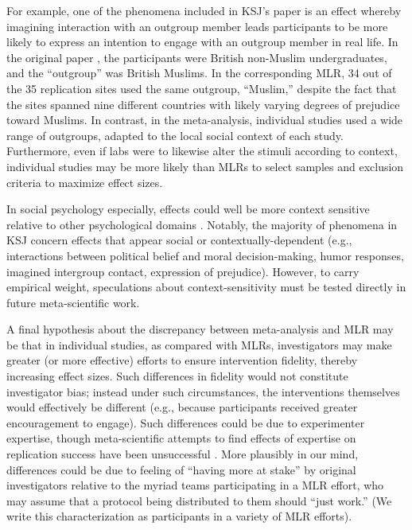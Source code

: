 \documentclass[man,floatsintext]{apa7}
\begin{document}
For example, one of the phenomena included in KSJ’s paper is an effect whereby imagining interaction with an outgroup member leads participants to be more likely to express an intention to engage with an outgroup member in real life. In the original paper \parencite{husnu2010elaboration}, the participants were British non-Muslim undergraduates, and the “outgroup” was British Muslims. In the corresponding MLR, 34 out of the 35 replication sites used the same outgroup, “Muslim,” despite the fact that the sites spanned nine different countries with likely varying degrees of prejudice toward Muslims. In contrast, in the meta-analysis, individual studies used a wide range of outgroups, adapted to the local social context of each study. Furthermore, even if labs were to likewise alter the stimuli according to context, individual studies may be more likely than MLRs to select samples and exclusion criteria to maximize effect sizes.

In social psychology especially, effects could well be more context sensitive relative to other psychological domains \parencite{van2016contextual,inbar2016association}. Notably, the majority of phenomena in KSJ concern effects that appear social or contextually-dependent (e.g., interactions between political belief and moral decision-making, humor responses, imagined intergroup contact, expression of prejudice). However, to carry empirical weight, speculations about context-sensitivity must be tested directly in future meta-scientific work. 

A final hypothesis about the discrepancy between meta-analysis and MLR may be that in individual studies, as compared with MLRs, investigators may make greater (or more effective) efforts to ensure intervention fidelity, thereby increasing effect sizes. Such differences in fidelity would not constitute investigator bias; instead under such circumstances, the interventions themselves would effectively be different (e.g., because participants received greater encouragement to engage). Such differences could be due to experimenter expertise, though meta-scientific attempts to find effects of expertise on replication success have been unsuccessful \parencite{open2015estimating}. More plausibly in our mind, differences could be due to feeling of “having more at stake” by original investigators relative to the myriad teams participating in a MLR effort, who may assume that a protocol being distributed to them should “just work.” (We write this characterization as participants in a variety of MLR efforts). 
\end{document}
